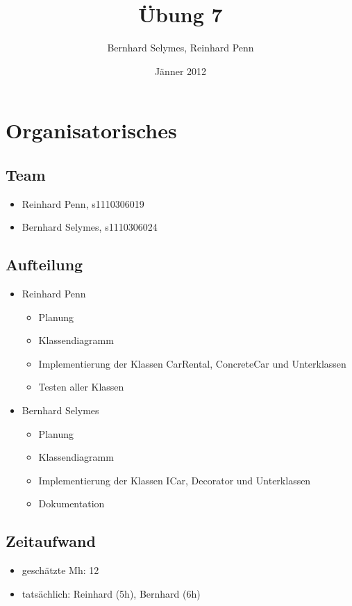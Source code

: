 \documentclass[12pt,a4paper]{article}
\begin{document}
\title{Übung 7}
\author{Bernhard Selymes, Reinhard Penn}
\date{Jänner 2012}

\normalsize

\newcommand{\CodePath}{../CarRental/CarRental/}

\section{Organisatorisches}

\subsection{Team}
	\begin {itemize} 
		\item Reinhard Penn, s1110306019 
		\item Bernhard Selymes, s1110306024
	\end {itemize}

\subsection{Aufteilung}
	\begin {itemize} 
		\item Reinhard Penn
			\begin {itemize}
				\item Planung
				\item Klassendiagramm
				\item Implementierung der Klassen CarRental, ConcreteCar und Unterklassen
				\item Testen aller Klassen
			\end {itemize}
		\item Bernhard Selymes
			\begin {itemize}
				\item Planung
				\item Klassendiagramm
				\item Implementierung der Klassen ICar, Decorator und Unterklassen
				\item Dokumentation		
			\end {itemize}
	\end {itemize}


\subsection{Zeitaufwand}
	\begin {itemize}
		\item geschätzte Mh: 12
		\item tatsächlich: Reinhard (5h), Bernhard  (6h)
	\end {itemize}
\end{document}
